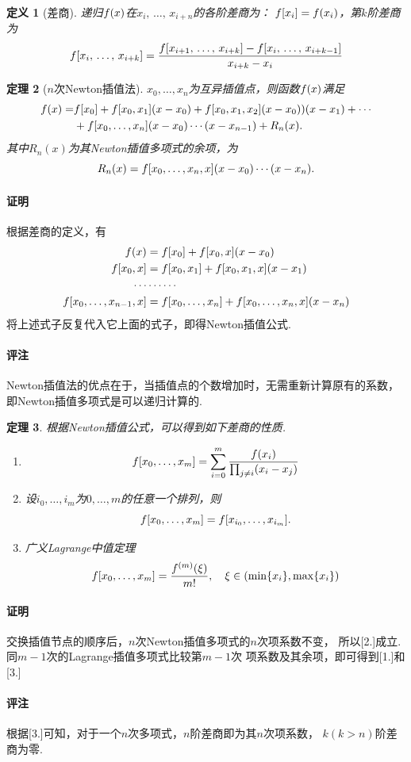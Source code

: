 \documentclass[12pt, a4paper]{article}
\theoremstyle{margin}
\newtheorem{thm}{定理}
\newtheorem{defi}[thm]{定义}
\newcommand{\f}{\mathnormal{f}}
\newcommand{\remark}{\paragraph{评注}}
\newcommand{\proof}{\paragraph{证明}}
\begin{document}
  \begin{defi}[差商]
    递归$\f(x)$在$x_{i},\,\dots,\,x_{i+n}$的各阶差商为：
    $\f[x_i] = \f(x_i)$，第$k$阶差商为
    \[
      \f[x_i,\,\dots,\,x_{i+k}] =
      \frac{\f[x_{i+1},\,\dots,\,x_{i+k}] - \f[x_i,\,\dots,\,x_{i+k-1}]}
      {x_{i+k} - x_i}
    \]
  \end{defi}


  \begin{thm}[$n$次Newton插值法]
    \label{thm: Newton插值法}
    $x_0,\dots,x_n$为互异插值点，则函数$\f(x)$满足
    \[\begin{split}
      \f(x) =& \f[x_0] + \f[x_0, x_1](x-x_0) + \f[x_0,x_1,x_2](x-x_0))(x-x_1) + \cdots \\
      & + \f[x_0,\dots,x_n](x-x_0)\cdots(x-x_{n-1}) + R_n(x).
    \end{split}\]
    其中$R_n(x)$为其Newton插值多项式的余项，为
    \[
      R_n(x) = \f[x_0,\dots,x_n,x](x-x_0)\cdots(x-x_n).
    \]
  \end{thm}
  \proof
    根据差商的定义，有
    \[\begin{split}
      \f(x) &= \f[x_0] + \f[x_0, x](x-x_0) \\
      \f[x_0, x] &= \f[x_0, x_1] + \f[x_0, x_1, x](x-x_1) \\
      \cdots & \cdots\cdots \\
      \f[x_0,\dots,x_{n-1}, x] &= \f[x_0,\dots,x_n] +
      \f[x_0,\dots,x_n,x](x-x_n)
    \end{split}\]
    将上述式子反复代入它上面的式子，即得Newton插值公式.
  \remark
    Newton插值法的优点在于，当插值点的个数增加时，无需重新计算原有的系数，
    即Newton插值多项式是可以递归计算的.

  \begin{thm}
    根据Newton插值公式，可以得到如下差商的性质.
    \begin{enumerate}
      \item
      \[
        \f[x_0,\dots,x_m] =
        \sum_{i=0}^m\frac{\f(x_i)}{\prod_{j\ne i}(x_i-x_j)}
      \]
      \item 设$i_0,\dots,i_m$为$0,\dots, m$的任意一个排列，则
      \[
        \f[x_0,\dots,x_m] = \f[x_{i_0},\dots,x_{i_m}].
      \]
      \item 广义Lagrange中值定理
      \[
        \f[x_0,\dots,x_m] = \frac{\f^{(m)}(\xi)}{m!},\quad
        \xi\in(\min\{x_i\}, \max\{x_i\})
      \]
    \end{enumerate}
  \end{thm}
  \proof
    交换插值节点的顺序后，$n$次Newton插值多项式的$n$次项系数不变，
    所以[2.]成立. 同$m-1$次的Lagrange插值多项式比较第$m-1$次
    项系数及其余项，即可得到[1.]和[3.]
  \remark
    根据[3.]可知，对于一个$n$次多项式，$n$阶差商即为其$n$次项系数，
    $k(k>n)$阶差商为零.
\end{document}
